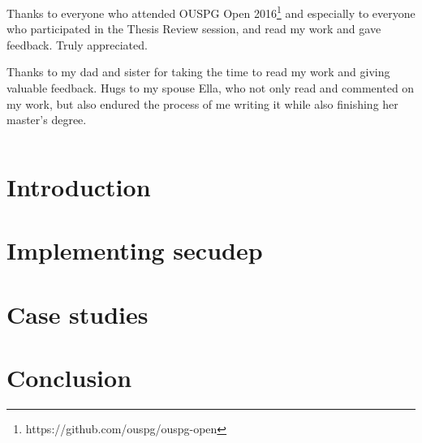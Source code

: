 \documentclass[a4paper,12pt,titlepage]{dithesis}
\begin{document}
Thanks to everyone who attended OUSPG Open
2016\footnote{https://github.com/ouspg/ouspg-open} and especially to
everyone who participated in the Thesis Review session, and read my
work and gave feedback. Truly appreciated.

Thanks to my dad and sister for taking the time to read my work and
giving valuable feedback. Hugs to my spouse Ella, who not only read
and commented on my work, but also endured the process of me writing
it while also finishing her master's degree.




\setlongtables
\begin{longtable}[l]{p{3cm}p{}}
  
\end{longtable}
\setcounter{table}{0}

\chapter{Introduction}
\sivunumerot{}

\chapter{Implementing secudep}

\chapter{Case studies}


\chapter{Conclusion}



\end{document}
